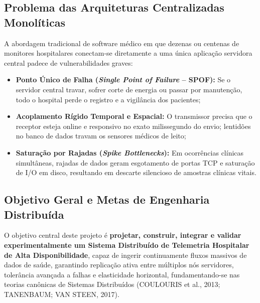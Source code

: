 \documentclass[12pt,a4paper]{article}
\begin{document}
\subsection{Problema das Arquiteturas Centralizadas Monolíticas}
A abordagem tradicional de software médico em que dezenas ou centenas de monitores hospitalares conectam-se diretamente a uma única aplicação servidora central padece de vulnerabilidades graves:
\begin{itemize}
	\item \textbf{Ponto Único de Falha (\textit{Single Point of Failure} -- SPOF):} Se o servidor central travar, sofrer corte de energia ou passar por manutenção, todo o hospital perde o registro e a vigilância dos pacientes;
	\item \textbf{Acoplamento Rígido Temporal e Espacial:} O transmissor precisa que o receptor esteja online e responsivo no exato milissegundo do envio; lentidões no banco de dados travam os sensores médicos de leito;
	\item \textbf{Saturação por Rajadas (\textit{Spike Bottlenecks}):} Em ocorrências clínicas simultâneas, rajadas de dados geram esgotamento de portas TCP e saturação de I/O em disco, resultando em descarte silencioso de amostras clínicas vitais.
\end{itemize}

\subsection{Objetivo Geral e Metas de Engenharia Distribuída}
O objetivo central deste projeto é \textbf{projetar, construir, integrar e validar experimentalmente um Sistema Distribuído de Telemetria Hospitalar de Alta Disponibilidade}, capaz de ingerir continuamente fluxos massivos de dados de saúde, garantindo replicação ativa entre múltiplos nós servidores, tolerância avançada a falhas e elasticidade horizontal, fundamentando-se nas teorias canônicas de Sistemas Distribuídos (COULOURIS et al., 2013; TANENBAUM; VAN STEEN, 2017).
\end{document}
